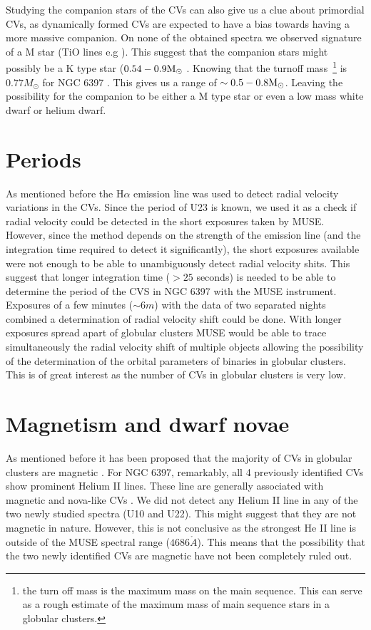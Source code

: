Studying the companion stars of the CVs can also give us a clue about primordial CVs, as dynamically formed CVs are expected to have a bias towards having a more massive companion. On none of the obtained spectra we observed signature of a M star (TiO lines e.g \citep{Marsh_secondary_1990}). This suggest that the companion stars might possibly be a K type star ($0.54 - 0.9 \text M _\odot$ \citep{gray2005observation}. Knowing that the turnoff mass~\footnote{the turn off mass is the maximum mass on the main sequence. This can serve as a rough estimate of the maximum mass of main sequence stars in a globular clusters.} is $0.77 M_\odot$ for NGC 6397 \citep{de_marco_spectroscopic_2005}. This gives us a range of $\sim 0.5 - 0.8 \text M _\odot$. Leaving the possibility for the companion to be either a M type star or even a low mass white dwarf or helium dwarf.

\section{Periods}

As mentioned before the H$\alpha$ emission line was used to detect radial velocity variations in the CVs. Since the period of U23 is known, we used it as a check if radial velocity could be detected in the short exposures taken by MUSE. However, since the method depends on the strength of the emission line (and the integration time required to detect it significantly), the short exposures available were not enough to be able to unambiguously detect radial velocity shits. This suggest that longer integration time ($> 25$ seconds) is needed to be able to determine the period of the CVS in NGC 6397 with the MUSE instrument. Exposures of a few minutes ($\sim 6 m$) with the data of two separated nights combined a determination of radial velocity shift could be done. With longer exposures spread apart of globular clusters MUSE would be able to trace simultaneously the radial velocity shift of multiple objects allowing the possibility of the determination of the orbital parameters of binaries in globular clusters. This is of great interest as the number of CVs in globular clusters is very low.  

\section{Magnetism and dwarf novae}

 As mentioned before it has been proposed that the majority of CVs in globular clusters are magnetic \citep{grindlay_magnetic_1999}. For NGC 6397, remarkably, all 4 previously identified CVs show prominent Helium II lines. These line are generally associated with magnetic and nova-like CVs \citep{echevarria_statistical_1988}. We did not detect any Helium II line in any of the two newly studied spectra (U10 and U22). This might suggest that they are not magnetic in nature. However, this is not conclusive as the strongest He II line is outside of the MUSE spectral range ($4686 \mathring{A}$). This means that the possibility that the two newly identified CVs are magnetic have not been completely ruled out. 

